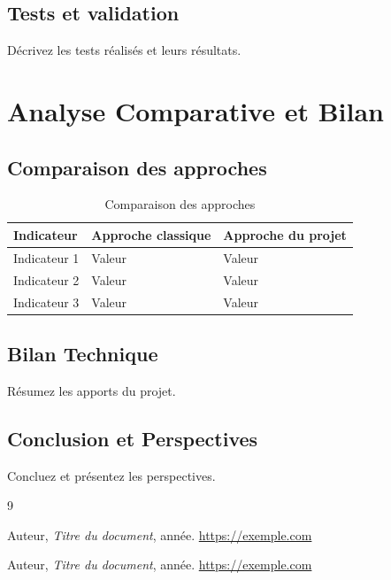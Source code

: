 \documentclass{rapportFSR}
\begin{document}
\subsection{Tests et validation}
Décrivez les tests réalisés et leurs résultats.

\section{Analyse Comparative et Bilan}

\subsection{Comparaison des approches}

\begin{table}[h]
\centering
\begin{tabular}{|l|p{5cm}|p{5cm}|}
\hline
\textbf{Indicateur} & \textbf{Approche classique} & \textbf{Approche du projet} \\ \hline
Indicateur 1 & Valeur & Valeur \\ \hline
Indicateur 2 & Valeur & Valeur \\ \hline
Indicateur 3 & Valeur & Valeur \\ \hline
\end{tabular}
\caption{Comparaison des approches}
\end{table}

\subsection{Bilan Technique}

Résumez les apports du projet.

\subsection{Conclusion et Perspectives}

Concluez et présentez les perspectives.
\newpage


\begin{thebibliography}{9}

Auteur, \emph{Titre du document}, année.  
\url{https://exemple.com}

Auteur, \emph{Titre du document}, année.  
\url{https://exemple.com}

\end{thebibliography}
\end{document}
